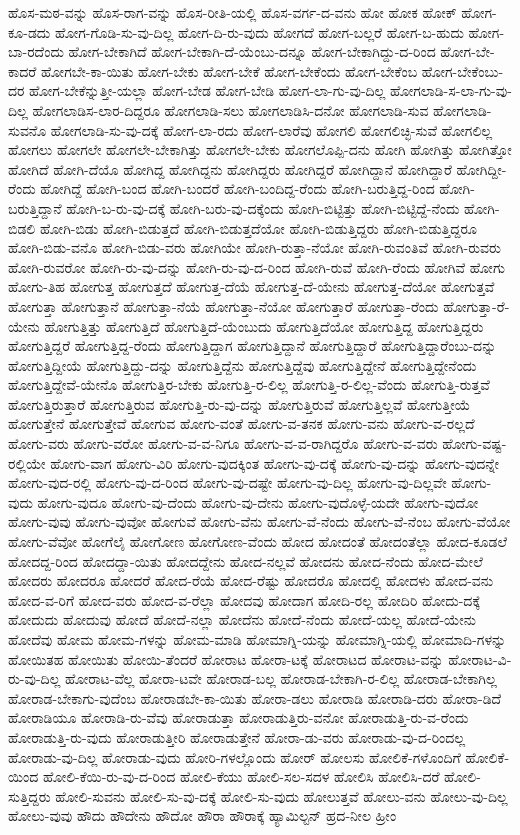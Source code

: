 ಹೊಸ-ಮಠ-ವನ್ನು
ಹೊಸ-ರಾಗ-ವನ್ನು
ಹೊಸ-ರೀತಿ-ಯಲ್ಲಿ
ಹೊಸ-ವರ್ಗ-ದ-ವನು
ಹೋ
ಹೋಕ
ಹೋಕ್
ಹೋಗ-ಕೂ-ಡದು
ಹೋಗ-ಗೊಡಿ-ಸು-ವು-ದಿಲ್ಲ
ಹೋಗ-ದಿ-ರು-ವುದು
ಹೋಗದೆ
ಹೋಗ-ಬಲ್ಲರೆ
ಹೋಗ-ಬ-ಹುದು
ಹೋಗ-ಬಾ-ರದೆಂದು
ಹೋಗ-ಬೇಕಾಗಿದೆ
ಹೋಗ-ಬೇಕಾಗಿ-ದೆ-ಯೆಂಬು-ದನ್ನೂ
ಹೋಗ-ಬೇಕಾಗಿದ್ದು-ದ-ರಿಂದ
ಹೋಗ-ಬೇ-ಕಾದರೆ
ಹೋಗಬೇ-ಕಾ-ಯಿತು
ಹೋಗ-ಬೇಕು
ಹೋಗ-ಬೇಕೆ
ಹೋಗ-ಬೇಕೆಂದು
ಹೋಗ-ಬೇಕೆಂಬ
ಹೋಗ-ಬೇಕೆಂಬು-ದರ
ಹೋಗ-ಬೇಕೆನ್ನುತ್ತೀ-ಯಲ್ಲಾ
ಹೋಗ-ಬೇಡ
ಹೋಗ-ಬೇಡಿ
ಹೋಗ-ಲಾ-ಗು-ವು-ದಿಲ್ಲ
ಹೋಗಲಾಡಿ-ಸ-ಲಾ-ಗು-ವು-ದಿಲ್ಲ
ಹೋಗಲಾಡಿಸ-ಲಾರ-ದಿದ್ದರೂ
ಹೋಗಲಾಡಿ-ಸಲು
ಹೋಗಲಾಡಿಸಿ-ದನೋ
ಹೋಗಲಾಡಿ-ಸುವ
ಹೋಗಲಾಡಿ-ಸುವನೊ
ಹೋಗಲಾಡಿ-ಸು-ವು-ದಕ್ಕೆ
ಹೋಗ-ಲಾ-ರದು
ಹೋಗ-ಲಾರೆವು
ಹೋಗಲಿ
ಹೋಗಲಿಚ್ಛಿ-ಸುವೆ
ಹೋಗಲಿಲ್ಲ
ಹೋಗಲು
ಹೋಗಲೇ
ಹೋಗಲೇ-ಬೇಕಾಗಿತ್ತು
ಹೋಗಲೇ-ಬೇಕು
ಹೋಗಲೊಪ್ಪಿ-ದನು
ಹೋಗಿ
ಹೋಗಿತ್ತು
ಹೋಗಿತ್ತೋ
ಹೋಗಿದೆ
ಹೋಗಿ-ದೆಯೊ
ಹೋಗಿದ್ದ
ಹೋಗಿದ್ದನು
ಹೋಗಿದ್ದರು
ಹೋಗಿದ್ದರೆ
ಹೋಗಿದ್ದಾನೆ
ಹೋಗಿದ್ದಾರೆ
ಹೋಗಿದ್ದೀ-ರೆಂದು
ಹೋಗಿದ್ದೆ
ಹೋಗಿ-ಬಂದ
ಹೋಗಿ-ಬಂದರೆ
ಹೋಗಿ-ಬಂದಿದ್ದ-ರೆಂದು
ಹೋಗಿ-ಬರುತ್ತಿದ್ದ-ರಿಂದ
ಹೋಗಿ-ಬರುತ್ತಿದ್ದಾನೆ
ಹೋಗಿ-ಬ-ರು-ವು-ದಕ್ಕೆ
ಹೋಗಿ-ಬರು-ವು-ದಕ್ಕೆಂದು
ಹೋಗಿ-ಬಿಟ್ಟಿತ್ತು
ಹೋಗಿ-ಬಿಟ್ಟಿದ್ದೆ-ನೆಂದು
ಹೋಗಿ-ಬಿಡಲಿ
ಹೋಗಿ-ಬಿಡು
ಹೋಗಿ-ಬಿಡುತ್ತದೆ
ಹೋಗಿ-ಬಿಡುತ್ತದೆಯೋ
ಹೋಗಿ-ಬಿಡುತ್ತಿದ್ದರು
ಹೋಗಿ-ಬಿಡುತ್ತಿದ್ದರೂ
ಹೋಗಿ-ಬಿಡು-ವನೊ
ಹೋಗಿ-ಬಿಡು-ವರು
ಹೋಗಿಯೇ
ಹೋಗಿ-ರುತ್ತಾ-ನೆಯೋ
ಹೋಗಿ-ರುವಂತಿವೆ
ಹೋಗಿ-ರುವರು
ಹೋಗಿ-ರುವರೋ
ಹೋಗಿ-ರು-ವು-ದನ್ನು
ಹೋಗಿ-ರು-ವು-ದ-ರಿಂದ
ಹೋಗಿ-ರುವೆ
ಹೋಗಿ-ರೆಂದು
ಹೋಗಿವೆ
ಹೋಗು
ಹೋಗು-ತಿಹ
ಹೋಗುತ್ತ
ಹೋಗುತ್ತದೆ
ಹೋಗುತ್ತ-ದೆಯೆ
ಹೋಗುತ್ತ-ದೆ-ಯೇನು
ಹೋಗುತ್ತ-ದೆಯೋ
ಹೋಗುತ್ತವೆ
ಹೋಗುತ್ತಾ
ಹೋಗುತ್ತಾನೆ
ಹೋಗುತ್ತಾ-ನೆಯೆ
ಹೋಗುತ್ತಾ-ನೆಯೋ
ಹೋಗುತ್ತಾರೆ
ಹೋಗುತ್ತಾ-ರೆಂದು
ಹೋಗುತ್ತಾ-ರೆ-ಯೇನು
ಹೋಗುತ್ತಿತ್ತು
ಹೋಗುತ್ತಿದೆ
ಹೋಗುತ್ತಿದೆ-ಯೆಂಬುದು
ಹೋಗುತ್ತಿದೆಯೋ
ಹೋಗುತ್ತಿದ್ದ
ಹೋಗುತ್ತಿದ್ದರು
ಹೋಗುತ್ತಿದ್ದರೆ
ಹೋಗುತ್ತಿದ್ದ-ರೆಂದು
ಹೋಗುತ್ತಿದ್ದಾಗ
ಹೋಗುತ್ತಿದ್ದಾನೆ
ಹೋಗುತ್ತಿದ್ದಾರೆ
ಹೋಗುತ್ತಿದ್ದಾರೆಂಬು-ದನ್ನು
ಹೋಗುತ್ತಿದ್ದೀಯೆ
ಹೋಗುತ್ತಿದ್ದು-ದನ್ನು
ಹೋಗುತ್ತಿದ್ದೆನು
ಹೋಗುತ್ತಿದ್ದೆವು
ಹೋಗುತ್ತಿದ್ದೇನೆ
ಹೋಗುತ್ತಿದ್ದೇನೆಂದು
ಹೋಗುತ್ತಿದ್ದೇವೆ-ಯೇನೊ
ಹೋಗುತ್ತಿರ-ಬೇಕು
ಹೋಗುತ್ತಿ-ರ-ಲಿಲ್ಲ
ಹೋಗುತ್ತಿ-ರ-ಲಿಲ್ಲ-ವೆಂದು
ಹೋಗುತ್ತಿ-ರುತ್ತವೆ
ಹೋಗುತ್ತಿರುತ್ತಾರೆ
ಹೋಗುತ್ತಿರುವ
ಹೋಗುತ್ತಿ-ರು-ವು-ದನ್ನು
ಹೋಗುತ್ತಿರುವೆ
ಹೋಗುತ್ತಿಲ್ಲವೆ
ಹೋಗುತ್ತೀಯೆ
ಹೋಗುತ್ತೇನೆ
ಹೋಗುತ್ತೇವೆ
ಹೋಗುವ
ಹೋಗು-ವಂತೆ
ಹೋಗು-ವ-ತನಕ
ಹೋಗು-ವನು
ಹೋಗು-ವ-ರಲ್ಲದೆ
ಹೋಗು-ವರು
ಹೋಗು-ವರೋ
ಹೋಗು-ವ-ವ-ನಿಗೂ
ಹೋಗು-ವ-ವ-ರಾಗಿದ್ದರೊ
ಹೋಗು-ವ-ವರು
ಹೋಗು-ವಷ್ಟ-ರಲ್ಲಿಯೇ
ಹೋಗು-ವಾಗ
ಹೋಗು-ವಿರಿ
ಹೋಗು-ವುದಕ್ಕಿಂತ
ಹೋಗು-ವು-ದಕ್ಕೆ
ಹೋಗು-ವು-ದನ್ನು
ಹೋಗು-ವುದನ್ನೇ
ಹೋಗು-ವುದ-ರಲ್ಲಿ
ಹೋಗು-ವು-ದ-ರಿಂದ
ಹೋಗು-ವು-ದಷ್ಟೇ
ಹೋಗು-ವು-ದಿಲ್ಲ
ಹೋಗು-ವು-ದಿಲ್ಲವೇ
ಹೋಗು-ವುದು
ಹೋಗು-ವುದೂ
ಹೋಗು-ವು-ದೆಂದು
ಹೋಗು-ವು-ದೇನು
ಹೋಗು-ವುದೊಳ್ಳೆ-ಯದೇ
ಹೋಗು-ವುದೋ
ಹೋಗು-ವುವು
ಹೋಗು-ವುವೋ
ಹೋಗುವೆ
ಹೋಗು-ವೆನು
ಹೋಗು-ವೆ-ನೆಂದು
ಹೋಗು-ವೆ-ನೆಂಬ
ಹೋಗು-ವೆಯೋ
ಹೋಗು-ವೆವೋ
ಹೋಗೆಲೈ
ಹೋಗೋಣ
ಹೋಗೋಣ-ವೆಂದು
ಹೋದ
ಹೋದಂತೆ
ಹೋದಂತೆಲ್ಲಾ
ಹೋದ-ಕೂಡಲೆ
ಹೋದದ್ದ-ರಿಂದ
ಹೋದದ್ದಾ-ಯಿತು
ಹೋದದ್ದೇನು
ಹೋದ-ನಲ್ಲವೆ
ಹೋದನು
ಹೋದ-ನೆಂದು
ಹೋದ-ಮೇಲೆ
ಹೋದರು
ಹೋದರೂ
ಹೋದರೆ
ಹೋದ-ರೆಯೆ
ಹೋದ-ರೆಷ್ಟು
ಹೋದರೊ
ಹೋದಲ್ಲಿ
ಹೋದಳು
ಹೋದ-ವನು
ಹೋದ-ವ-ರಿಗೆ
ಹೋದ-ವರು
ಹೋದ-ವ-ರೆಲ್ಲಾ
ಹೋದವು
ಹೋದಾಗ
ಹೋದಿ-ರಲ್ಲ
ಹೋದಿರಿ
ಹೋದು-ದಕ್ಕೆ
ಹೋದುದು
ಹೋದುವು
ಹೋದೆ
ಹೋದೆ-ನಲ್ಲಾ
ಹೋದೆನು
ಹೋದೆ-ನೆಂದು
ಹೋದೆ-ಯಲ್ಲ
ಹೋದೆ-ಯೇನು
ಹೋದೆವು
ಹೋಮ
ಹೋಮ-ಗಳನ್ನು
ಹೋಮ-ಮಾಡಿ
ಹೋಮಾಗ್ನಿ-ಯನ್ನು
ಹೋಮಾಗ್ನಿ-ಯಲ್ಲಿ
ಹೋಮಾದಿ-ಗಳನ್ನು
ಹೋಯಿತಹ
ಹೋಯಿತು
ಹೋಯಿ-ತೆಂದರೆ
ಹೋರಾಟ
ಹೋರಾ-ಟಕ್ಕೆ
ಹೋರಾಟದ
ಹೋರಾಟ-ವನ್ನು
ಹೋರಾಟ-ವಿ-ರು-ವು-ದಿಲ್ಲ
ಹೋರಾಟ-ವೆಲ್ಲ
ಹೋರಾ-ಟವೇ
ಹೋರಾಡ-ಬಲ್ಲ
ಹೋರಾಡ-ಬೇಕಾಗಿ-ರ-ಲಿಲ್ಲ
ಹೋರಾಡ-ಬೇಕಾಗಿಲ್ಲ
ಹೋರಾಡ-ಬೇಕಾಗು-ವುದೆಂಬ
ಹೋರಾಡಬೇ-ಕಾ-ಯಿತು
ಹೋರಾ-ಡಲು
ಹೋರಾಡಿ
ಹೋರಾಡಿ-ದರು
ಹೋರಾ-ಡಿದೆ
ಹೋರಾಡಿಯೂ
ಹೋರಾಡಿ-ರು-ವೆವು
ಹೋರಾಡುತ್ತಾ
ಹೋರಾಡುತ್ತಿರು-ವನೋ
ಹೋರಾಡುತ್ತಿ-ರು-ವ-ರೆಂದು
ಹೋರಾಡುತ್ತಿ-ರು-ವುದು
ಹೋರಾಡುತ್ತೀರಿ
ಹೋರಾಡುತ್ತೇನೆ
ಹೋರಾ-ಡು-ವರು
ಹೋರಾಡು-ವು-ದ-ರಿಂದಲ್ಲ
ಹೋರಾಡು-ವು-ದಿಲ್ಲ
ಹೋರಾಡು-ವುದು
ಹೋರಿ-ಗಳಲ್ಲೊಂದು
ಹೋರ್‌
ಹೋಲಸು
ಹೋಲಿಕೆ-ಗಳೊಂದಿಗೆ
ಹೋಲಿಕೆ-ಯಿಂದ
ಹೋಲಿ-ಕೆಯಿ-ರು-ವು-ದ-ರಿಂದ
ಹೋಲಿ-ಕೆಯು
ಹೋಲಿ-ಸಲ-ಸದಳ
ಹೋಲಿಸಿ
ಹೋಲಿಸಿ-ದರೆ
ಹೋಲಿ-ಸುತ್ತಿದ್ದರು
ಹೋಲಿ-ಸುವನು
ಹೋಲಿ-ಸು-ವು-ದಕ್ಕೆ
ಹೋಲಿ-ಸು-ವುದು
ಹೋಲುತ್ತವೆ
ಹೋಲು-ವನು
ಹೋಲು-ವು-ದಿಲ್ಲ
ಹೋಲು-ವುವು
ಹೌದು
ಹೌದೇನು
ಹೌದೋ
ಹೌರಾ
ಹೌರಾಕ್ಕೆ
ಹ್ಯಾಮಿಲ್ಟನ್
ಹ್ರದ-ನೀಲ
ಹ್ರೀಂ